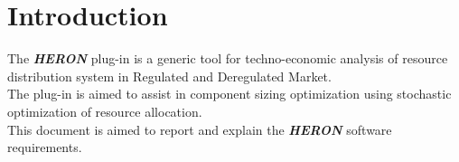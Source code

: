 \section{Introduction}
The \textbf{\textit{HERON}} plug-in is a generic tool for techno-economic analysis of resource distribution system in Regulated and Deregulated Market.
\\The plug-in is aimed to assist in component sizing optimization using stochastic optimization of resource allocation.
\\This document is aimed to report and explain the  \textbf{\textit{HERON}} software requirements.
